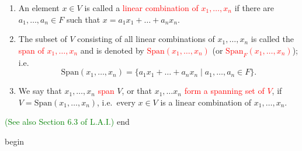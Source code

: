 \documentclass[
  12pt,
  a4paper,
  twoside]{article}
\providecommand{\tightlist}{%
  \setlength{\itemsep}{0pt}\setlength{\parskip}{0pt}}
\theoremstyle{plain}
\theoremstyle{definition}
\begin{document}
\begin{enumerate}
\def\labelenumi{(\alph{enumi})}
\tightlist
\item
  An element \(x \in V\) is called a \textcolor{red}{linear combination of $x_1, \dots, x_n$} if there are \(a_1, \dots, a_n \in F\) such that \(x = a_1x_1 + \dots + a_nx_n\).
\item
  The subset of \(V\) consisting of all linear combinations of \(x_1, \dots, x_n\) is called the \textcolor{red}{span of $x_1, \dots, x_n$} and is denoted by \textcolor{red}{$\mathrm{Span}(x_1, \dots, x_n)$} (or \textcolor{red}{$\mathrm{Span}_F(x_1, \dots, x_n)$}); i.e.
  \[ \mathrm{Span}(x_1, \dots, x_n) = \{ a_1x_1 + \dots + a_nx_n \mid a_1, \dots,  a_n \in F \}. \]
\item
  We say that \(x_1, \dots, x_n\) \textcolor{red}{span} \(V\), or that \(x_1, \dots x_n\) \textcolor{red}{form a spanning set of $V$}, if \(V = \mathrm{Span}(x_1, \dots, x_n)\), i.e.~every \(x \in V\) is a linear combination of \(x_1, \dots, x_n\).
\end{enumerate}

\textcolor{green}{(See also Section 6.3 of L.A.I.)}
\csname end

\csname begin\label{cnj:expl-spans}
\end{document}
